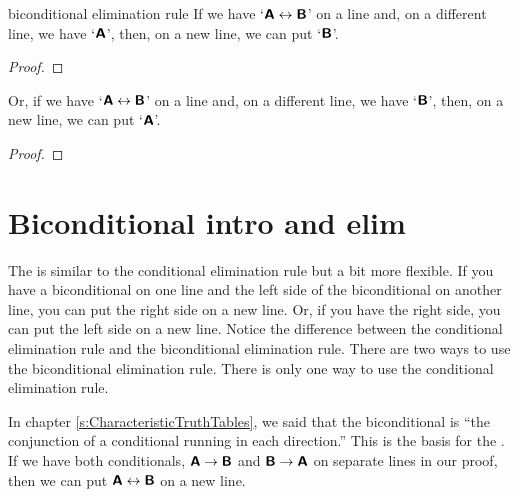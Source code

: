 \begin{factboxy}{biconditional elimination rule}\label{be-rule}
\small{If we have `$\bm{\mathsf{A}}\leftrightarrow\bm{\mathsf{B}}$' on a line and, on a different line, we have `$\bm{\mathsf{A}}$', then, on a new line, we can put `$\bm{\mathsf{B}}$'.}

\begin{proof}
	 
\end{proof}

\small{Or, if we have `$\bm{\mathsf{A}}\leftrightarrow\bm{\mathsf{B}}$' on a line and, on a different line, we have `$\bm{\mathsf{B}}$', then, on a new line, we can put `$\bm{\mathsf{A}}$'.} 

\begin{proof}
	 
\end{proof}

\end{factboxy}



\section{Biconditional intro and elim}\label{s:bi-rules}

The  is similar to the conditional elimination rule but a bit more flexible. If you have a biconditional on one line and the left side of the biconditional on another line, you can put the right side on a new line. Or, if you have the right side, you can put the left side on a new line. Notice the difference between the conditional elimination rule and the biconditional elimination rule. There are two ways to use the biconditional elimination rule. There is only one way to use the conditional elimination rule.

In chapter \ref{s:CharacteristicTruthTables}, we said that the biconditional is ``the conjunction of a conditional running in each direction.'' This is the basis for the . If we have both conditionals, $\bm{\mathsf{A}} \rightarrow \bm{\mathsf{B}}$ and $\bm{\mathsf{B}} \rightarrow \bm{\mathsf{A}}$ on separate lines in our proof, then we can put $\bm{\mathsf{A}} \leftrightarrow \bm{\mathsf{B}}$ on a new line.

